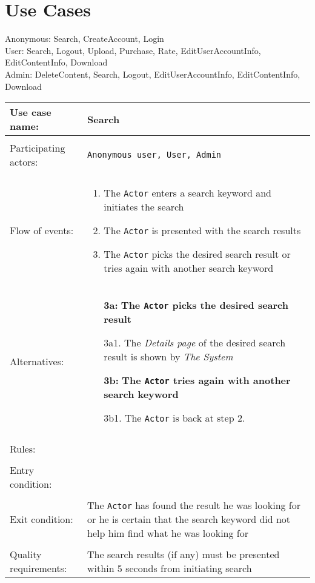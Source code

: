 \documentclass[../report.tex]{subfiles}
\begin{document}
\section{Use Cases}
Anonymous: Search, CreateAccount, Login \\
User: Search, Logout, Upload, Purchase, Rate, EditUserAccountInfo, EditContentInfo, Download \\
Admin: DeleteContent, Search, Logout, EditUserAccountInfo, EditContentInfo, Download \\

\noindent
\begin{tabular}{ l p{8cm} }                      
 Use case name:  & Search   \\   \hline \\                
 Participating actors:  & \texttt{Anonymous user, User, Admin} \\   \hline \\
  Flow of events: & \begin{enumerate}
\item{The \texttt{Actor} enters a search keyword and initiates the search}
\item{The \texttt{Actor} is presented with the search results}
\item{The \texttt{Actor} picks the desired search result or tries again with another search keyword}
\end{enumerate} \\
Alternatives: & \begin{itemize}
\item[\textbf{3a:}] \textbf{The \texttt{Actor} picks the desired search result}
\item[]  3a1. The \textit{Details page} of the desired search result is shown by \textit{The System}
\item[\textbf{3b:}] \textbf{The \texttt{Actor} tries again with another search keyword}
\item[]  3b1. The \texttt{Actor} is back at step 2.
\end{itemize} \\ 
\hline \\
Rules: & \\ \hline \\
Entry condition: & \\ \hline \\
Exit condition: & The \texttt{Actor} has found the result he was looking for or he is certain that the search keyword did not help him find what he was looking for \\ \hline \\
Quality requirements: & The search results (if any) must be presented within 5 seconds from initiating search \\ \hline           
\end{tabular}
\end{document}
